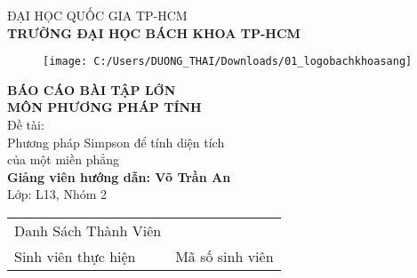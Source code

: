 \documentclass[14pt,a4paper]{article}
\begin{document}
\thispagestyle{empty}
\begin{titlepage}
\begin{center}
	\fontsize{16pt}{0pt}\selectfont ĐẠI HỌC QUỐC GIA TP-HCM\\
	\vspace{6pt}\textbf{\fontsize{16pt}{0pt}\selectfont TRƯỜNG ĐẠI HỌC BÁCH KHOA TP-HCM\\}
	\vspace{0.3cm}
	\begin{figure}[H]
		\centering
     \texttt{[image: C:/Users/DUONG\_THAI/Downloads/01\_logobachkhoasang]}
	\end{figure}
	\vspace{0.2cm}
	\textbf{\fontsize{20pt}{0pt}\selectfont BÁO CÁO BÀI TẬP LỚN\\}
	\vspace{0.2cm}
	\textbf{\fontsize{18pt}{0pt}\selectfont MÔN PHƯƠNG PHÁP TÍNH\\}
	\vspace{0.2cm}
\fontsize{20pt}{0pt}\selectfont Đề tài:\\

	\fontsize{22pt}{0pt}\selectfont Phương pháp Simpson để tính diện tích \\
	\fontsize{22pt}{0pt}\selectfont của một miền phẳng\\
	\vspace{0.5cm}
	\textbf{\fontsize{20pt}{0pt}\selectfont Giảng viên hướng dẫn: Võ Trần An\\}
	\vspace{0.2cm}
	\fontsize{20pt}{0pt}\selectfont Lớp: L13, Nhóm 2\\
	\vspace{0.5cm}
	\begin{tabular}{l l}
		\fontsize{16pt}{0pt}\selectfont Danh Sách Thành Viên \vspace{6pt}\\
		\fontsize{16pt}{0pt}\selectfont Sinh viên thực hiện & \fontsize{16pt}{0pt}\selectfont Mã số sinh viên\\
	
	\end{tabular}


\end{center}
\end{titlepage}
\cleardoublepage 
\thispagestyle{empty}
\end{document}
